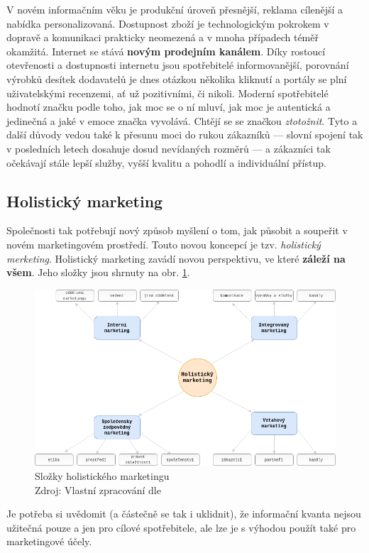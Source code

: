 V novém informačním věku je produkční úroveň přesnější, reklama cílenější a nabídka personalizovaná. Dostupnost zboží je technologickým pokrokem v dopravě a komunikaci prakticky neomezená a v mnoha případech téměř okamžitá. Internet se stává \textbf{novým prodejním kanálem}. Díky rostoucí otevřenosti a dostupnosti internetu jsou spotřebitelé informovanější, porovnání výrobků desítek dodavatelů je dnes otázkou několika kliknutí a portály se plní uživatelskými recenzemi, ať už pozitivními, či nikoli.
Moderní spotřebitelé hodnotí značku podle toho, jak moc se o ní mluví, jak moc je autentická a jedinečná a jaké v emoce značka vyvolává. Chtějí se se značkou \textit{ztotožnit}.\cite{bergh2012coolznacky}
Tyto a další důvody vedou také k přesunu moci do rukou zákazníků --- slovní spojení  tak v posledních letech dosahuje dosud nevídaných rozměrů --- a zákazníci tak očekávají stále lepší služby, vyšší kvalitu a pohodlí a individuální přístup.

\subsection{Holistický marketing}

Společnosti tak potřebují nový způsob myšlení o tom, jak působit a soupeřit v novém marketingovém prostředí. Touto novou koncepcí je tzv. \textit{holistický merketing}.
\cite{kotler2007marketingmanagement} Holistický marketing zavádí novou perspektivu, ve které \textbf{záleží na všem}. Jeho složky jsou shrnuty na obr. \ref{fig:slozky-holistickeho-marketingu}.

\begin{figure}[htbp!]
    \centering
    \includegraphics[width=.88\textwidth]{assets/slozky-holistickeho-marketingu.png}
    \caption[Složky holistického marketingu]{Složky holistického marketingu \\ Zdroj: Vlastní zpracování dle \textcite[s. 56]{kotler2007marketingmanagement}}
    \label{fig:slozky-holistickeho-marketingu}
\end{figure}

Je potřeba si uvědomit (a částečně se tak i uklidnit), že informační kvanta nejsou užitečná pouze a jen pro cílové spotřebitele, ale lze je s výhodou použít také pro marketingové účely.